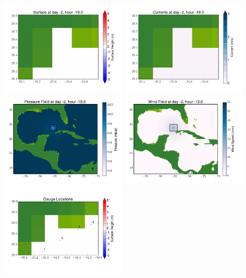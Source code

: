 \documentclass[11pt]{article}
\begin{document}
\includegraphics[width=0.475\textwidth]{frame0005fig6.png}
\vskip 10pt 
\includegraphics[width=0.475\textwidth]{frame0005fig7.png}
\includegraphics[width=0.475\textwidth]{frame0005fig8.png}
\vskip 10pt 
\includegraphics[width=0.475\textwidth]{frame0005fig9.png}
\includegraphics[width=0.475\textwidth]{frame0005fig10.png}
\end{document}
